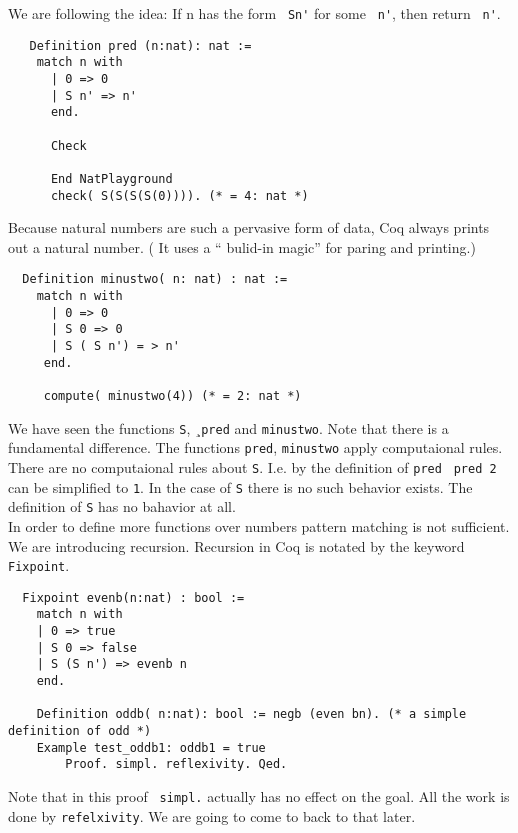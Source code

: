   We are following the idea:  If n has the form \lstinline! Sn'! for some \lstinline! n'!, then return  \lstinline! n'!.
  \begin{example}
   \begin{lstlisting}
   Definition pred (n:nat): nat :=
   	match n with 
   	  | 0 => 0
   	  | S n' => n'
   	  end.
   	  
   	  Check 
   	  
   	  End NatPlayground
   	  check( S(S(S(S(0)))). (* = 4: nat *)
   \end{lstlisting}
  \end{example}
  Because natural numbers are such a pervasive form of data, Coq always prints out a natural number. ( It uses a `` bulid-in magic'' for paring and printing.)
 
  \begin{lstlisting}
  Definition minustwo( n: nat) : nat :=
    match n with
      | 0 => 0
      | S 0 => 0
      | S ( S n') = > n'
     end.
     
     compute( minustwo(4)) (* = 2: nat *)
  \end{lstlisting}  
  We have seen the functions \lstinline!S!, ¸\lstinline!pred! and \lstinline!minustwo!.
  Note that there is a fundamental difference. The functions \lstinline!pred!, \lstinline!minustwo! apply computaional rules. There are no computaional rules  about \lstinline!S!.
  I.e. by the definition of \lstinline!pred! \lstinline! pred 2! can be simplified to \lstinline!1!. In the case of \lstinline!S! there is no such behavior exists.
  The definition of \lstinline!S! has no bahavior at all.\\ 
    
  In order to define more functions over numbers pattern matching is not sufficient. We are introducing recursion.
  Recursion in Coq is notated by the keyword \lstinline!Fixpoint!.
  
  \begin{lstlisting}
  Fixpoint evenb(n:nat) : bool :=
  	match n with
  	| 0 => true
  	| S 0 => false
  	| S (S n') => evenb n
  	end.
  	
  	Definition oddb( n:nat): bool := negb (even bn). (* a simple definition of odd *)
  	Example test_oddb1: oddb1 = true
    	Proof. simpl. reflexivity. Qed.
  \end{lstlisting}
   Note that in this proof \lstinline! simpl.! actually has no effect on the goal. 
   All the work is done by \lstinline!refelxivity!. We are going to come to back to that later.
   
